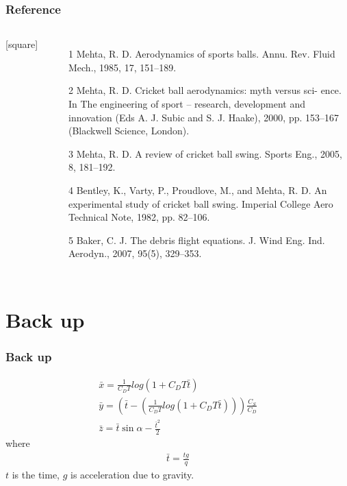 \documentclass{beamer}
\begin{document}
\begin{frame}
\frametitle{Reference}
\begin{columns}
  
[square]
  \begin{itemize}
  \item [1]Mehta, R. D. Aerodynamics of sports balls. Annu. Rev.
Fluid Mech., 1985, 17, 151–189.
  \item [2]Mehta, R. D. Cricket ball aerodynamics: myth versus sci-
ence. In The engineering of sport – research, development
and innovation (Eds A. J. Subic and S. J. Haake), 2000,
pp. 153–167 (Blackwell Science, London).
  \item [3]Mehta, R. D. A review of cricket ball swing. Sports Eng.,
2005, 8, 181–192.
  \item [4]Bentley, K., Varty, P., Proudlove, M., and Mehta, R. D. An
experimental study of cricket ball swing. Imperial College
Aero Technical Note, 1982, pp. 82–106.
  \item [5] Baker, C. J. The debris flight equations. J. Wind Eng. Ind.
Aerodyn., 2007, 95(5), 329–353.
  \end{itemize}

\end{columns}

\end{frame}
\section{Back up}
\begin{frame}
\frametitle{Back up}
\begin{align}
\bar{x}= \frac{1}{C_D T}log(1+C_D T \bar{t})\\
\bar{y}= (\bar{t}-(\frac{1}{C_D T}log(1+C_D T \bar{t})))\frac{C_S}{C_D}\\
\bar{z}=\bar{t}\sin\alpha - \frac{\bar{t}^2}{2}
\end{align}
where
\begin{align}
\bar{t}= \frac{t g}{q}
\end{align}
$t$ is the time, $g$ is  acceleration due to gravity.

\end{frame}
\newpage

\end{document}
